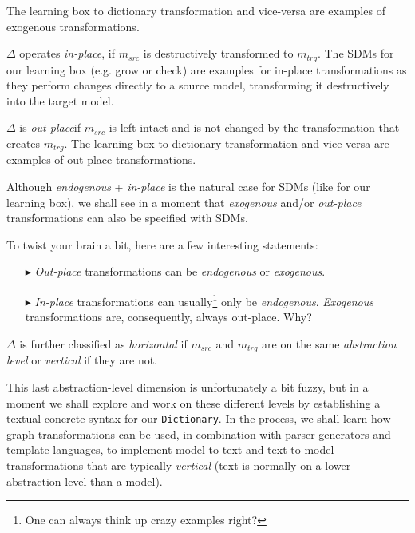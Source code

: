 The learning box to dictionary transformation and vice-versa are examples of exogenous transformations.

$\Delta$ operates \emph{in-place}, if $m_{src}$ is destructively transformed to $m_{trg}$. The SDMs for our learning
box (e.g. grow or check) are examples for in-place transformations as they perform changes directly to a source model, transforming it destructively into the
target model.

$\Delta$ is \emph{out-place}if $m_{src}$ is left intact and is not changed by the transformation that creates
$m_{trg}$. The learning box to dictionary transformation and vice-versa are examples of out-place transformations.

Although \emph{endogenous} + \emph{in-place} is the natural case for SDMs (like for our learning box), we shall see in a moment that \emph{exogenous} and/or
\emph{out-place} transformations can also be specified with SDMs.
 
To twist your brain a bit, here are a few interesting statements:
\begin{enumerate}

\item[$\blacktriangleright$] \emph{Out-place} transformations can be \emph{endogenous} or \emph{exogenous}.

\item[$\blacktriangleright$] \emph{In-place} transformations can usually\footnote{One can always think up crazy examples right?} only be \emph{endogenous}. 
\emph{Exogenous} transformations are, consequently, always out-place.  Why?

\end{enumerate}  

  
$\Delta$ is further classified as \emph{horizontal} if $m_{src}$ and $m_{trg}$ are on the same \emph{abstraction level} or
\emph{vertical} if they are not.

This last abstraction-level dimension is unfortunately a bit fuzzy, but in a moment we shall explore and work on these different levels by establishing a
textual concrete syntax for our \texttt{Dictionary}. In the process, we shall learn how graph transformations can be used, in combination with parser generators
and template languages, to implement model-to-text and text-to-model transformations that are typically \emph{vertical} (text is normally on a lower
abstraction level than a model).

